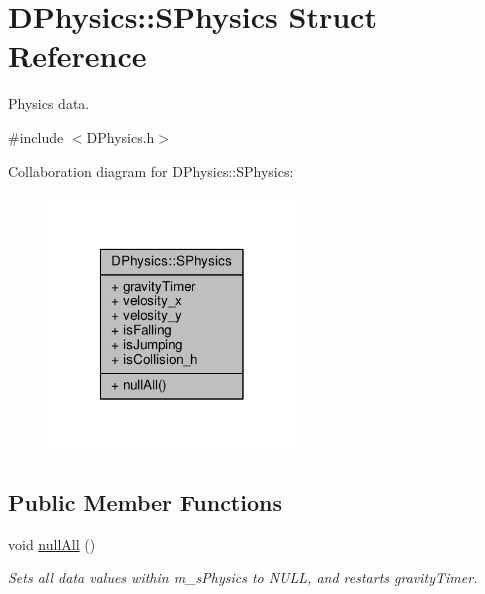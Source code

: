 \hypertarget{structDPhysics_1_1SPhysics}{\section{D\-Physics\-:\-:S\-Physics Struct Reference}
\label{structDPhysics_1_1SPhysics}
}


Physics data.  




{\ttfamily \#include $<$D\-Physics.\-h$>$}



Collaboration diagram for D\-Physics\-:\-:S\-Physics\-:\nopagebreak
\begin{figure}[H]
\begin{center}
\leavevmode
\includegraphics[width=186pt]{structDPhysics_1_1SPhysics__coll__graph}
\end{center}
\end{figure}
\subsection*{Public Member Functions}
\begin{DoxyCompactItemize}
\item 
void \hyperlink{structDPhysics_1_1SPhysics_aa4cf9f9d5ae6ab52b53a76d7bc507e55}{null\-All} ()
\begin{DoxyCompactList}\small\item\em Sets all data values within m\-\_\-s\-Physics to N\-U\-L\-L, and restarts gravity\-Timer. \end{DoxyCompactList}\end{DoxyCompactItemize}
